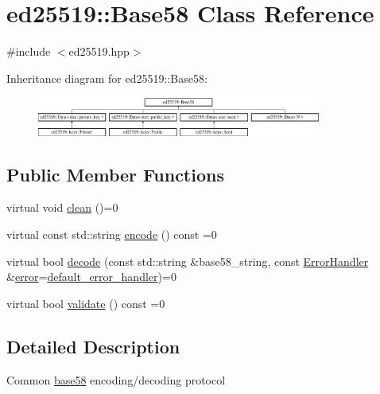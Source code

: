 \hypertarget{classed25519_1_1_base58}{}\section{ed25519\+:\+:Base58 Class Reference}
\label{classed25519_1_1_base58}


{\ttfamily \#include $<$ed25519.\+hpp$>$}

Inheritance diagram for ed25519\+:\+:Base58\+:\begin{figure}[H]
\begin{center}
\leavevmode
\includegraphics[height=1.278539cm]{classed25519_1_1_base58}
\end{center}
\end{figure}
\subsection*{Public Member Functions}
\begin{DoxyCompactItemize}
\item 
virtual void \mbox{\hyperlink{classed25519_1_1_base58_aed901927e6a283e0c4d3fb13745233dc}{clean}} ()=0
\item 
virtual const std\+::string \mbox{\hyperlink{classed25519_1_1_base58_a1b52a018a5215e2dcf2aa388b0fe06bf}{encode}} () const =0
\item 
virtual bool \mbox{\hyperlink{classed25519_1_1_base58_a3cb74be32923dcfb03a24b65015bee84}{decode}} (const std\+::string \&base58\+\_\+string, const \mbox{\hyperlink{namespaceed25519_a6ba572942b3c18591fc869d52a6b16e6}{Error\+Handler}} \&\mbox{\hyperlink{namespaceed25519_ac93d0b5156eaca22197055e902920bc4}{error}}=\mbox{\hyperlink{namespaceed25519_a7c7bb6ed17541162959c33ed3e3b15fb}{default\+\_\+error\+\_\+handler}})=0
\item 
virtual bool \mbox{\hyperlink{classed25519_1_1_base58_addfdb1d6d0f7e7f0cd0cf5dd2ee193bb}{validate}} () const =0
\end{DoxyCompactItemize}


\subsection{Detailed Description}
Common \mbox{\hyperlink{namespaceed25519_1_1base58}{base58}} encoding/decoding protocol 


